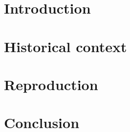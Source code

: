 \section*{Introduction}


\section*{Historical context}


\section*{Reproduction}


\section*{Conclusion}
